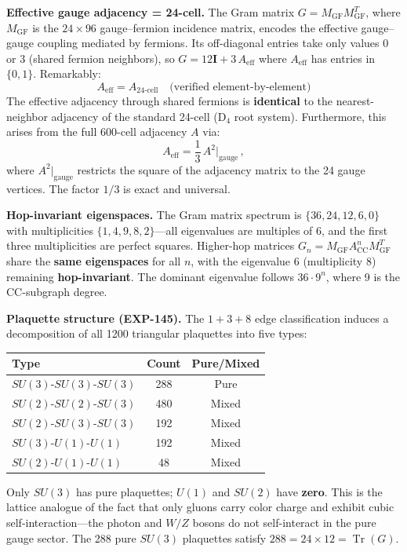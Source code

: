 \documentclass[12pt,a4paper]{article}
\begin{document}
\textbf{Effective gauge adjacency = 24-cell.} The Gram matrix $G = M_{\text{GF}} M_{\text{GF}}^T$, where $M_{\text{GF}}$ is the $24 \times 96$ gauge--fermion incidence matrix, encodes the effective gauge--gauge coupling mediated by fermions. Its off-diagonal entries take only values 0 or 3 (shared fermion neighbors), so $G = 12\mathbf{I} + 3\,A_{\text{eff}}$ where $A_{\text{eff}}$ has entries in $\{0, 1\}$. Remarkably:
\begin{equation}
A_{\text{eff}} = A_{\text{24-cell}} \quad \text{(verified element-by-element)}
\end{equation}
The effective adjacency through shared fermions is \textbf{identical} to the nearest-neighbor adjacency of the standard 24-cell (D$_4$ root system). Furthermore, this arises from the full 600-cell adjacency $A$ via:
\begin{equation}
A_{\text{eff}} = \frac{1}{3}\, A^2\big|_{\text{gauge}} \,,
\end{equation}
where $A^2|_{\text{gauge}}$ restricts the square of the adjacency matrix to the 24 gauge vertices. The factor $1/3$ is exact and universal.

\textbf{Hop-invariant eigenspaces.} The Gram matrix spectrum is $\{36, 24, 12, 6, 0\}$ with multiplicities $\{1, 4, 9, 8, 2\}$---all eigenvalues are multiples of 6, and the first three multiplicities are perfect squares. Higher-hop matrices $G_n = M_{\text{GF}} A_{\text{CC}}^n M_{\text{GF}}^T$ share the \textbf{same eigenspaces} for all $n$, with the eigenvalue $6$ (multiplicity 8) remaining \textbf{hop-invariant}. The dominant eigenvalue follows $36 \cdot 9^n$, where 9 is the CC-subgraph degree.

\textbf{Plaquette structure (EXP-145).} The $1 + 3 + 8$ edge classification induces a decomposition of all 1200 triangular plaquettes into five types:
\begin{center}
\begin{tabular}{lcc}
\toprule
\textbf{Type} & \textbf{Count} & \textbf{Pure/Mixed} \\
\midrule
$SU(3)$-$SU(3)$-$SU(3)$ & 288 & Pure \\
$SU(2)$-$SU(2)$-$SU(3)$ & 480 & Mixed \\
$SU(2)$-$SU(3)$-$SU(3)$ & 192 & Mixed \\
$SU(3)$-$U(1)$-$U(1)$ & 192 & Mixed \\
$SU(2)$-$U(1)$-$U(1)$ & 48 & Mixed \\
\bottomrule
\end{tabular}
\end{center}
Only $SU(3)$ has pure plaquettes; $U(1)$ and $SU(2)$ have \textbf{zero}. This is the lattice analogue of the fact that only gluons carry color charge and exhibit cubic self-interaction---the photon and $W/Z$ bosons do not self-interact in the pure gauge sector. The 288 pure $SU(3)$ plaquettes satisfy $288 = 24 \times 12 = \operatorname{Tr}(G)$.
\end{document}
